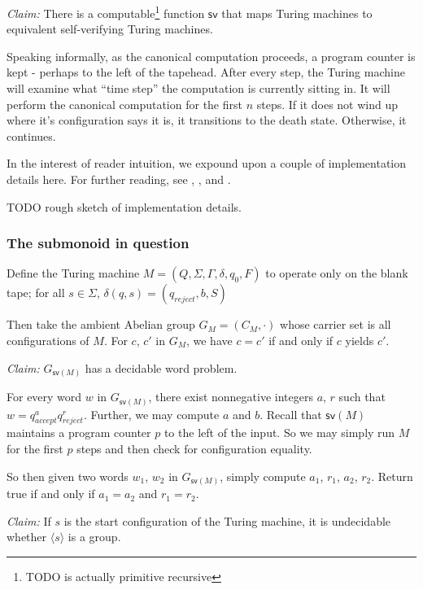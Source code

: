 \documentclass[11pt]{article}
\begin{document}
\textit{Claim:} There is a computable\footnote{TODO is actually
  primitive recursive} function $\textsf{sv}$ that maps Turing
machines to equivalent self-verifying Turing machines.

Speaking informally, as the canonical computation proceeds, a program
counter is kept - perhaps to the left of the tapehead. After every
step, the Turing machine will examine what ``time step'' the
computation is currently sitting in. It will perform the canonical
computation for the first $n$ steps. If it does not wind up where it's
configuration says it is, it transitions to the death
state. Otherwise, it continues.

In the interest of reader intuition, we expound upon a couple of
implementation details here. For further reading, see
\cite{davis:note_utm}, \cite{davis:defn_utm}, and
\cite{shepherdson:machine_config}.

TODO rough sketch of implementation details.

\subsubsection*{The submonoid in question}
Define the Turing machine $M = (Q, \Sigma, \Gamma, \delta, q_0, F)$ to
operate only on the blank tape; for all $s \in \Sigma$,
$\delta(q, s) = (q_{reject}, b, S)$


Then take the ambient Abelian group $G_M = (C_M, \cdot)$ whose carrier
set is all configurations of $M$. For $c$, $c'$ in $G_M$, we have
$c = c'$ if and only if $c$ yields $c'$.

\textit{Claim:} $G_{\textsf{sv}(M)}$ has a decidable word problem.

For every word $w$ in $G_{\textsf{sv}(M)}$, there exist nonnegative
integers $a$, $r$ such that $w = q_{accept}^a q_{reject}^r$. Further,
we may compute $a$ and $b$. Recall that $\textsf{sv}(M)$ maintains a
program counter $p$ to the left of the input. So we may simply run $M$
for the first $p$ steps and then check for configuration equality.

So then given two words $w_1$, $w_2$ in $G_{\textsf{sv}(M)}$, simply
compute $a_1$, $r_1$, $a_2$, $r_2$. Return true if and only if $a_1 = a_2$ and $r_1 = r_2$.

\textit{Claim:} If $s$ is the start configuration of the Turing
machine, it is undecidable whether $\langle s \rangle$ is a group.
\end{document}

